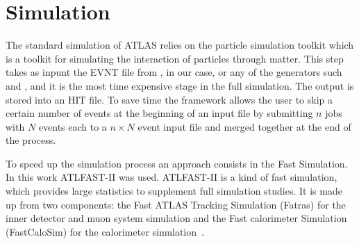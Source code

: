 \section{Simulation}
The standard simulation of ATLAS relies on the \geant particle simulation toolkit which is a toolkit for simulating the interaction of particles through matter. This step takes as inpunt the EVNT file from \PYTHIA, in our case, or any of the generators such \HERWIG and \SHERPA, and it is the most time expensive stage in the full simulation. The output is stored into an HIT file. To save time the framework allows the user to skip a certain number of events at the beginning of an input file by submitting $n$ jobs with $N$ events each to a $n\times N$ event input file and merged together at the end of the process.



To speed up the simulation process an approach consists in the Fast Simulation. In this work ATLFAST-II was used. ATLFAST-II is a kind of fast simulation, which provides large statistics to supplement full simulation studies. It is made up from two components: the Fast ATLAS Tracking Simulation (Fatras) for the inner detector and muon system simulation and the Fast calorimeter Simulation (FastCaloSim) for the calorimeter simulation~\cite{simulation}. 

